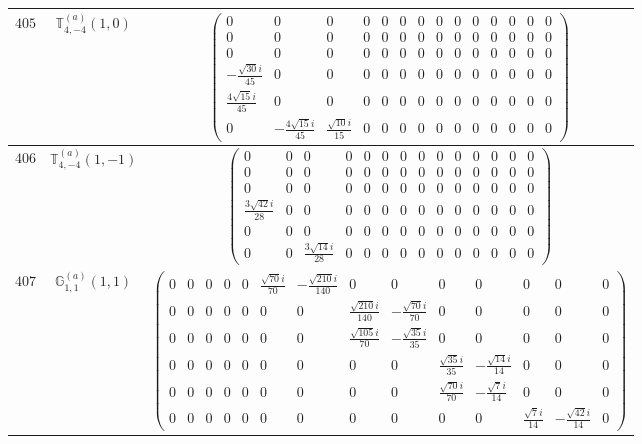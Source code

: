 \documentclass[fleqn,8pt,landscape]{jsarticle}
\begin{document}
\begin{center}
\begin{longtable}{ccc}
$ 405 $ & $ \mathbb{T}_{4,-4}^{(a)}(1,0) $ & $ \begin{pmatrix} 0 & 0 & 0 & 0 & 0 & 0 & 0 & 0 & 0 & 0 & 0 & 0 & 0 & 0 \\ 0 & 0 & 0 & 0 & 0 & 0 & 0 & 0 & 0 & 0 & 0 & 0 & 0 & 0 \\ 0 & 0 & 0 & 0 & 0 & 0 & 0 & 0 & 0 & 0 & 0 & 0 & 0 & 0 \\ - \frac{\sqrt{30} i}{45} & 0 & 0 & 0 & 0 & 0 & 0 & 0 & 0 & 0 & 0 & 0 & 0 & 0 \\ \frac{4 \sqrt{15} i}{45} & 0 & 0 & 0 & 0 & 0 & 0 & 0 & 0 & 0 & 0 & 0 & 0 & 0 \\ 0 & - \frac{4 \sqrt{15} i}{45} & \frac{\sqrt{10} i}{15} & 0 & 0 & 0 & 0 & 0 & 0 & 0 & 0 & 0 & 0 & 0 \end{pmatrix} $ \\ \hline
$ 406 $ & $ \mathbb{T}_{4,-4}^{(a)}(1,-1) $ & $ \begin{pmatrix} 0 & 0 & 0 & 0 & 0 & 0 & 0 & 0 & 0 & 0 & 0 & 0 & 0 & 0 \\ 0 & 0 & 0 & 0 & 0 & 0 & 0 & 0 & 0 & 0 & 0 & 0 & 0 & 0 \\ 0 & 0 & 0 & 0 & 0 & 0 & 0 & 0 & 0 & 0 & 0 & 0 & 0 & 0 \\ \frac{3 \sqrt{42} i}{28} & 0 & 0 & 0 & 0 & 0 & 0 & 0 & 0 & 0 & 0 & 0 & 0 & 0 \\ 0 & 0 & 0 & 0 & 0 & 0 & 0 & 0 & 0 & 0 & 0 & 0 & 0 & 0 \\ 0 & 0 & \frac{3 \sqrt{14} i}{28} & 0 & 0 & 0 & 0 & 0 & 0 & 0 & 0 & 0 & 0 & 0 \end{pmatrix} $ \\ \hline
$ 407 $ & $ \mathbb{G}_{1,1}^{(a)}(1,1) $ & $ \begin{pmatrix} 0 & 0 & 0 & 0 & 0 & \frac{\sqrt{70} i}{70} & - \frac{\sqrt{210} i}{140} & 0 & 0 & 0 & 0 & 0 & 0 & 0 \\ 0 & 0 & 0 & 0 & 0 & 0 & 0 & \frac{\sqrt{210} i}{140} & - \frac{\sqrt{70} i}{70} & 0 & 0 & 0 & 0 & 0 \\ 0 & 0 & 0 & 0 & 0 & 0 & 0 & \frac{\sqrt{105} i}{70} & - \frac{\sqrt{35} i}{35} & 0 & 0 & 0 & 0 & 0 \\ 0 & 0 & 0 & 0 & 0 & 0 & 0 & 0 & 0 & \frac{\sqrt{35} i}{35} & - \frac{\sqrt{14} i}{14} & 0 & 0 & 0 \\ 0 & 0 & 0 & 0 & 0 & 0 & 0 & 0 & 0 & \frac{\sqrt{70} i}{70} & - \frac{\sqrt{7} i}{14} & 0 & 0 & 0 \\ 0 & 0 & 0 & 0 & 0 & 0 & 0 & 0 & 0 & 0 & 0 & \frac{\sqrt{7} i}{14} & - \frac{\sqrt{42} i}{14} & 0 \end{pmatrix} $ \\ \hline

\end{longtable}
\end{center}
\end{document}
